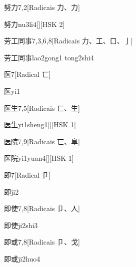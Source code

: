 \begin{entry}{努力}{7,2}[Radicais ⼒、⼒]
  \begin{phonetics}{努力}{nu3li4}[][HSK 2]
  \end{phonetics}
\end{entry}

\begin{entry}{劳工同事}{7,3,6,8}[Radicais ⼒、⼯、⼝、⼅]
  \begin{phonetics}{劳工同事}{lao2gong1 tong2shi4}
  \end{phonetics}
\end{entry}

\begin{entry}{医}{7}[Radical ⼖]
  \begin{phonetics}{医}{yi1}
  \end{phonetics}
\end{entry}

\begin{entry}{医生}{7,5}[Radicais ⼖、⽣]
  \begin{phonetics}{医生}{yi1sheng1}[][HSK 1]
  \end{phonetics}
\end{entry}

\begin{entry}{医院}{7,9}[Radicais ⼖、⾩]
  \begin{phonetics}{医院}{yi1yuan4}[][HSK 1]
  \end{phonetics}
\end{entry}

\begin{entry}{即}{7}[Radical ⼙]
  \begin{phonetics}{即}{ji2}
  \end{phonetics}
\end{entry}

\begin{entry}{即使}{7,8}[Radicais ⼙、⼈]
  \begin{phonetics}{即使}{ji2shi3}
  \end{phonetics}
\end{entry}

\begin{entry}{即或}{7,8}[Radicais ⼙、⼽]
  \begin{phonetics}{即或}{ji2huo4}
  \end{phonetics}
\end{entry}

